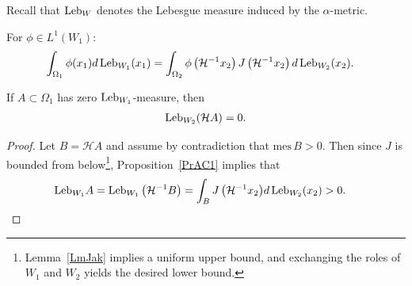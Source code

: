 \documentclass[AHL, Unicode, longabstracts,published]{cedram}
\newcommand{\mes}{{\mathrm{mes}}}
\newcommand{\hol}{\mathcal{H}}
\newcommand{\admName}{\alpha^{+}}
\newcommand{\Leb}{\textup{Leb}}
\renewcommand{\admName}{\alpha}
\begin{document}
Recall that $\Leb_{W}$ denotes the Lebesgue measure induced by the $\admName$-metric.
\begin{prop}\label{PrAC1}
For $\phi\in L^{1}(W_1)$:
\begin{align*}
\int_{\Omega_1} \phi(x_1) d\,\Leb_{W_{1}}(x_1) &=\int_{\Omega_2} \phi\left(\hol^{-1} x_{2}\right) J\left(\hol^{-1} x_{2}\right) d\,\Leb_{W_{2}}(x_{2}).
\end{align*}
\end{prop}
\begin{coro}\label{CrACMes}
If $A\subset \Omega_1$ has zero $\Leb_{W_{1}}$-measure, then
\begin{align*}
\Leb_{W_{2}}(\hol A)=0.
\end{align*}
\end{coro}
\begin{proof}
Let $B=\hol A$ and assume by contradiction that $\mes\,B > 0$. Then since $J$ is bounded from below\footnote{Lemma~\ref{LmJak} implies a uniform upper bound, and exchanging the roles of $W_{1}$ and $W_{2}$ yields the desired lower bound.}, Proposition~\ref{PrAC1} implies that
\begin{align*}
\Leb_{W_{1}}A = \Leb_{W_{1}}\left(\hol^{-1} B\right)=\int_B {J\left(\hol^{-1} x_2\right)}{d\,\Leb_{W_{2}}(x_2)}>0.& \qedhere
\end{align*}
\end{proof}
\end{document}
